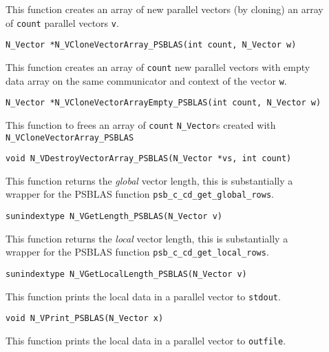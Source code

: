\documentclass[twoside,a4paper]{refart}
\begin{document}
\begin{description}
	\item[] This function creates an array of new parallel vectors (by cloning) an array of \lstinline[style=CStyle]|count| parallel vectors \lstinline[style=CStyle]|v|.
	
	 \lstinline[style=CStyle]|N_Vector *N_VCloneVectorArray_PSBLAS(int count, N_Vector w)|
	
	\item[] This function creates an array of \lstinline[style=CStyle]|count| new parallel vectors with empty data array on the same communicator and context of the vector \lstinline[style=CStyle]|w|. 
	
	 \lstinline[style=CStyle]|N_Vector *N_VCloneVectorArrayEmpty_PSBLAS(int count, N_Vector w)|
	
	\item[] This function to frees an array of \lstinline[style=CStyle]|count| \texttt{N\_Vector}s created with \texttt{N\_VCloneVectorArray\_PSBLAS}
	
	 \lstinline[style=CStyle]|void N_VDestroyVectorArray_PSBLAS(N_Vector *vs, int count)|
	
	\item[] This function returns the \emph{global} vector length, this is substantially a wrapper for the PSBLAS function \lstinline[style=CStyle]|psb_c_cd_get_global_rows|.
	
	 \lstinline[style=CStyle]|sunindextype N_VGetLength_PSBLAS(N_Vector v)|
	
	\item[] This function returns the \emph{local} vector length, this is substantially a wrapper for the PSBLAS function \lstinline[style=CStyle]|psb_c_cd_get_local_rows|.
	
	 \lstinline[style=CStyle]|sunindextype N_VGetLocalLength_PSBLAS(N_Vector v)|
	
	\item[] This function prints the local data in a parallel vector to \lstinline[style=CStyle]|stdout|.
	
	 \lstinline[style=CStyle]|void N_VPrint_PSBLAS(N_Vector x)|
	
	\item[] This function prints the local data in a parallel vector to \lstinline[style=CStyle]|outfile|.
	

\end{description}
\end{document}
